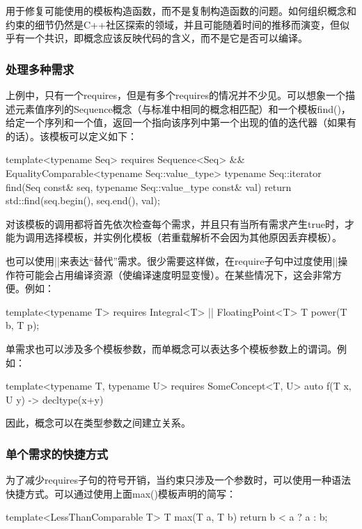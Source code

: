 用于修复可能使用的模板构造函数，而不是复制构造函数的问题。如何组织概念和约束的细节仍然是C++社区探索的领域，并且可能随着时间的推移而演变，但似乎有一个共识，即概念应该反映代码的含义，而不是它是否可以编译。

\subsubsection{处理多种需求}

上例中，只有一个requires，但是有多个requires的情况并不少见。可以想象一个描述元素值序列的Sequence概念（与标准中相同的概念相匹配）和一个模板find()，给定一个序列和一个值，返回一个指向该序列中第一个出现的值的迭代器（如果有的话）。该模板可以定义如下：

\begin{cpp}
template<typename Seq>
	requires Sequence<Seq> &&
			EqualityComparable<typename Seq::value_type>
	typename Seq::iterator find(Seq const& seq,
								typename Seq::value_type const& val)
{
	return std::find(seq.begin(), seq.end(), val);
}
\end{cpp}

对该模板的调用都将首先依次检查每个需求，并且只有当所有需求产生true时，才能为调用选择模板，并实例化模板（若重载解析不会因为其他原因丢弃模板）。

也可以使用||来表达“替代”需求。很少需要这样做，在require子句中过度使用||操作符可能会占用编译资源（使编译速度明显变慢）。在某些情况下，这会非常方便。例如：

\begin{cpp}
template<typename T>
	requires Integral<T> ||
			FloatingPoint<T>
T power(T b, T p);
\end{cpp}

单需求也可以涉及多个模板参数，而单概念可以表达多个模板参数上的谓词。例如：

\begin{cpp}
template<typename T, typename U>
	requires SomeConcept<T, U>
auto f(T x, U y) -> decltype(x+y)
\end{cpp}

因此，概念可以在类型参数之间建立关系。

\subsubsection{单个需求的快捷方式}

为了减少requires子句的符号开销，当约束只涉及一个参数时，可以使用一种语法快捷方式。可以通过使用上面max()模板声明的简写：

\begin{cpp}
template<LessThanComparable T>
T max(T a, T b) {
	return b < a ? a : b;
}
\end{cpp}

